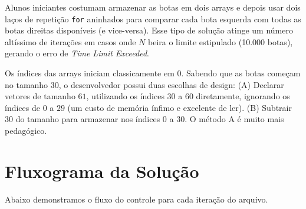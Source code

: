 \documentclass[11pt]{article}
\begin{document}
\begin{warnbox}
Alunos iniciantes costumam armazenar as botas em dois arrays e depois usar dois laços de repetição \texttt{for} aninhados para comparar cada bota esquerda com todas as botas direitas disponíveis (e vice-versa). Esse tipo de solução atinge um número altíssimo de iterações em casos onde $N$ beira o limite estipulado (10.000 botas), gerando o erro de \textit{Time Limit Exceeded}.
\end{warnbox}

\begin{successbox}
Os índices das arrays iniciam classicamente em 0. Sabendo que as botas começam no tamanho 30, o desenvolvedor possui duas escolhas de design:
(A) Declarar vetores de tamanho $61$, utilizando os índices $30$ a $60$ diretamente, ignorando os índices de $0$ a $29$ (um custo de memória ínfimo e excelente de ler).
(B) Subtrair 30 do tamanho para armazenar nos índices $0$ a $30$. O método A é muito mais pedagógico.
\end{successbox}

\section{Fluxograma da Solução}

Abaixo demonstramos o fluxo do controle para cada iteração do arquivo.
\end{document}
